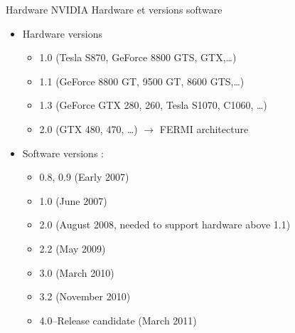 \documentclass{beamer}
\begin{document}
\begin{frame}[containsverbatim]{Hardware NVIDIA Hardware et versions software}
  
  \begin{itemize}
  \item Hardware versions
    \begin{itemize}
    \item 1.0 (Tesla S870, GeForce 8800 GTS, GTX,\ldots)
    \item 1.1 (GeForce 8800 GT, 9500 GT, 8600 GTS,\ldots)
    \item 1.3 (GeForce GTX 280, 260, Tesla S1070, C1060, \ldots)
    \item 2.0 (GTX 480, 470, \ldots) $\rightarrow$ FERMI architecture
    \end{itemize}
  \item Software versions :
    \begin{itemize}
    \item 0.8, 0.9 (Early 2007)
    \item 1.0 (June 2007)
    \item 2.0 (August 2008, needed to support hardware above 1.1)
    \item 2.2 (May 2009)
    \item 3.0 (March 2010)
    \item 3.2 (November 2010)
    \item 4.0--Release candidate (March 2011)
    \end{itemize}
  \end{itemize}
\end{frame}
\end{document}
